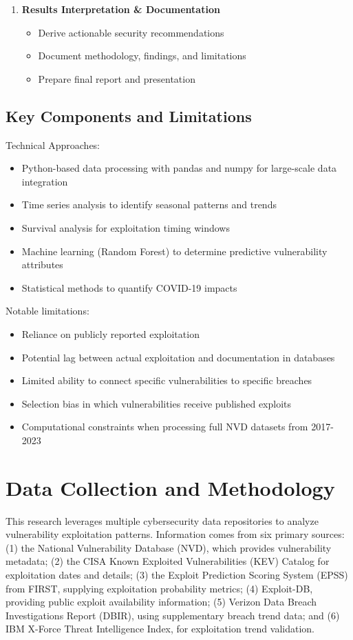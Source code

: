 \documentclass[runningheads]{llncs}
\begin{document}
\begin{enumerate}
    \item \textbf{Results Interpretation \& Documentation}
    \begin{itemize}
        \item Derive actionable security recommendations
        \item Document methodology, findings, and limitations
        \item Prepare final report and presentation
    \end{itemize}
\end{enumerate}

\subsection{Key Components and Limitations}
Technical Approaches:
\begin{itemize}
    \item Python-based data processing with pandas and numpy for large-scale data integration
    \item Time series analysis to identify seasonal patterns and trends
    \item Survival analysis for exploitation timing windows
    \item Machine learning (Random Forest) to determine predictive vulnerability attributes
    \item Statistical methods to quantify COVID-19 impacts
\end{itemize}

Notable limitations:
\begin{itemize}
    \item Reliance on publicly reported exploitation
    \item Potential lag between actual exploitation and documentation in databases
    \item Limited ability to connect specific vulnerabilities to specific breaches
    \item Selection bias in which vulnerabilities receive published exploits
    \item Computational constraints when processing full NVD datasets from 2017-2023
\end{itemize}

\section{Data Collection and Methodology}
This research leverages multiple cybersecurity data repositories to analyze vulnerability exploitation patterns. Information comes from six primary sources: (1) the National Vulnerability Database (NVD), which provides vulnerability metadata; (2) the CISA Known Exploited Vulnerabilities (KEV) Catalog for exploitation dates and details; (3) the Exploit Prediction Scoring System (EPSS) from FIRST, supplying exploitation probability metrics; (4) Exploit-DB, providing public exploit availability information; (5) Verizon Data Breach Investigations Report (DBIR), using supplementary breach trend data; and (6) IBM X-Force Threat Intelligence Index, for exploitation trend validation.
\end{document}
